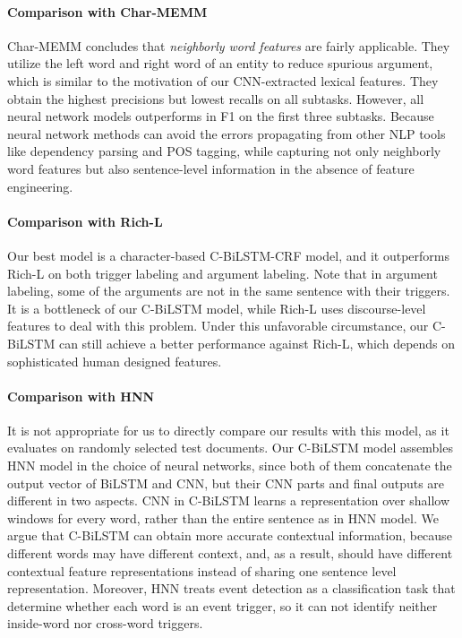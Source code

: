 \paragraph{Comparison with Char-MEMM} Char-MEMM concludes that \emph{neighborly word features} are fairly applicable. They utilize the left word and right word of an entity to reduce spurious argument, which is similar to the motivation of our CNN-extracted lexical features. They obtain the highest precisions but lowest recalls on all subtasks. However, all neural network models outperforms in F1 on the first three subtasks. Because neural network methods can avoid the errors propagating from other NLP tools like dependency parsing and POS tagging, while capturing not only neighborly word features but also sentence-level information in the absence of feature engineering.

\paragraph{Comparison with Rich-L} Our best model is a character-based C-BiLSTM-CRF model, and it outperforms Rich-L on both trigger labeling and argument labeling. Note that in argument labeling, some of the arguments are not in the same sentence with their triggers. It is a bottleneck of our C-BiLSTM model, while Rich-L uses discourse-level features to deal with this problem. Under this unfavorable circumstance, our C-BiLSTM can still achieve a better performance against Rich-L, which depends on sophisticated human designed features.

\paragraph{Comparison with HNN} It is not appropriate for us to directly compare our results with this model, as it evaluates on randomly selected test documents. Our C-BiLSTM model assembles HNN model in the choice of neural networks, since both of them concatenate the output vector of BiLSTM and CNN, but their CNN parts and final outputs are different in two aspects. CNN in C-BiLSTM learns a representation over shallow windows for every word, rather than the entire sentence as in HNN model. We argue that C-BiLSTM can obtain more accurate contextual information, because different words may have different context, and, as a result, should have different contextual feature representations instead of sharing one sentence level representation. Moreover, HNN treats event detection as a classification task that determine whether each word is an event trigger, so it can not identify neither inside-word nor cross-word triggers.

